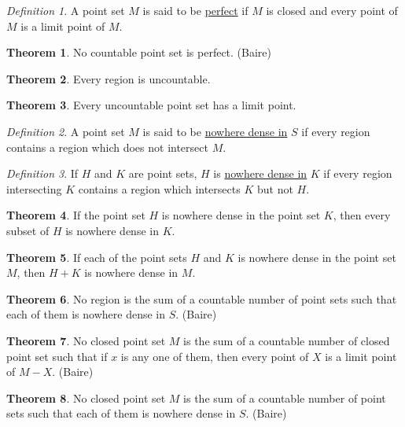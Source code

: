 \documentclass[12pt, oneside, letter] {amsart}
\theoremstyle {definition}
\newtheorem {thm} {Theorem}
\theoremstyle {remark}
\newtheorem* {defn} {Definition}
\begin{document}
\begin{defn}
  A point set $M$ is said to be \underline {perfect} if $M$ is closed
  and every point of $M$ is a limit point of $M$.
\end{defn}

\begin{thm}
  No countable point set is perfect. (Baire)
\end{thm}

\begin{thm}
  Every region is uncountable.
\end{thm}

\begin{thm}
  Every uncountable point set has a limit point.
\end{thm}

\begin{defn}
  A point set $M$ is said to be \underline {nowhere dense in} $S$ if
  every region contains a region which does not intersect $M$.
\end{defn}

\begin{defn}
  If $H$ and $K$ are point sets, $H$ is \underline {nowhere dense in}
  $K$ if every region intersecting $K$ contains a region which
  intersects $K$ but not $H$.
\end{defn}

\begin{thm}
  If the point set $H$ is nowhere dense in the point set $K$, then
  every subset of $H$ is nowhere dense in $K$.
\end{thm}

\begin{thm}
  If each of the point sets $H$ and $K$ is nowhere dense in the point
  set $M$, then $H + K$ is nowhere dense in $M$.
\end{thm}

\begin{thm}
  No region is the sum of a countable number of point sets such that
  each of them is nowhere dense in $S$. (Baire)
\end{thm}

\begin{thm}
  No closed point set $M$ is the sum of a countable number of closed
  point set such that if $x$ is any one of them, then every point of
  $X$ is a limit point of $M - X$. (Baire)
\end{thm}

\begin{thm}
  No closed point set $M$ is the sum of a countable number of point
  sets such that each of them is nowhere dense in $S$. (Baire)
\end{thm}
\end{document}
